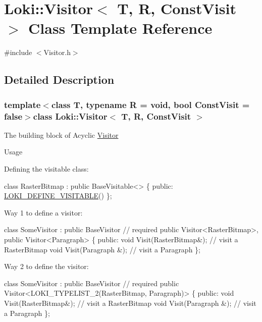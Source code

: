 \hypertarget{classLoki_1_1Visitor}{}\section{Loki\+:\+:Visitor$<$ T, R, Const\+Visit $>$ Class Template Reference}
\label{classLoki_1_1Visitor}


{\ttfamily \#include $<$Visitor.\+h$>$}



\subsection{Detailed Description}
\subsubsection*{template$<$class T, typename R = void, bool Const\+Visit = false$>$class Loki\+::\+Visitor$<$ T, R, Const\+Visit $>$}

The building block of Acyclic \hyperlink{classLoki_1_1Visitor}{Visitor}

\begin{DoxyParagraph}{Usage}

\end{DoxyParagraph}
Defining the visitable class\+:


\begin{DoxyCode}
\textcolor{keyword}{class }RasterBitmap : \textcolor{keyword}{public} BaseVisitable<>
\{
\textcolor{keyword}{public}:
    \hyperlink{group__VisitorGroup_ga2b6ed280714eca44a2713d3cee5b2093}{LOKI\_DEFINE\_VISITABLE}()
\};
\end{DoxyCode}


Way 1 to define a visitor\+: 
\begin{DoxyCode}
\textcolor{keyword}{class }SomeVisitor : 
    \textcolor{keyword}{public} BaseVisitor \textcolor{comment}{// required}
    \textcolor{keyword}{public} Visitor<RasterBitmap>,
    \textcolor{keyword}{public} Visitor<Paragraph>
\{
\textcolor{keyword}{public}:
    \textcolor{keywordtype}{void} Visit(RasterBitmap&); \textcolor{comment}{// visit a RasterBitmap}
    \textcolor{keywordtype}{void} Visit(Paragraph &);   \textcolor{comment}{// visit a Paragraph}
\};
\end{DoxyCode}


Way 2 to define the visitor\+: 
\begin{DoxyCode}
\textcolor{keyword}{class }SomeVisitor : 
    \textcolor{keyword}{public} BaseVisitor \textcolor{comment}{// required}
    \textcolor{keyword}{public} Visitor<LOKI\_TYPELIST\_2(RasterBitmap, Paragraph)>
\{
\textcolor{keyword}{public}:
    \textcolor{keywordtype}{void} Visit(RasterBitmap&); \textcolor{comment}{// visit a RasterBitmap}
    \textcolor{keywordtype}{void} Visit(Paragraph &);   \textcolor{comment}{// visit a Paragraph}
\};
\end{DoxyCode}


